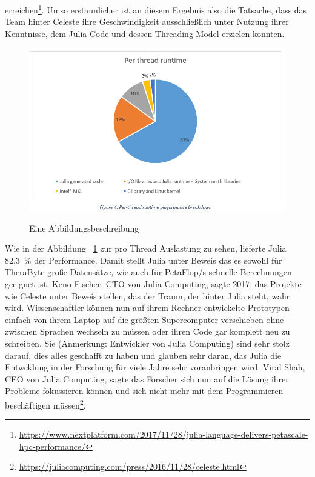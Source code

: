 \documentclass[proseminar,german,utf8]{zihpub}
\begin{document}
erreichen\footnote{\url{https://www.nextplatform.com/2017/11/28/julia-language-delivers-petascale-hpc-performance/}}. Umso erstaunlicher ist an diesem Ergebnis also die Tatsache, dass das Team hinter Celeste ihre Geschwindigkeit ausschließlich unter Nutzung ihrer Kenntnisse, dem Julia-Code und dessen Threading-Model erzielen konnten.

\begin{figure}[hbt!]
  \centering
  \caption{Eine Abbildungsbeschreibung}
  \includegraphics[scale=0.5]{bilder/celestejulia.png}
  \label{fig:celestejulia}
\end{figure}

Wie in der Abbildung ~\ref{fig:celestejulia} zur pro Thread Auslastung zu sehen, lieferte Julia 82.3~\% der Performance. Damit stellt Julia unter Beweis das es sowohl für TheraByte-große Datensätze, wie auch für PetaFlop/s-schnelle Berechnungen geeignet ist. Keno Fischer, CTO von Julia Computing, sagte 2017, das Projekte wie Celeste unter Beweis stellen, das der Traum, der hinter Julia steht, wahr wird. Wissenschaftler können nun auf ihrem Rechner entwickelte Prototypen einfach von ihrem Laptop auf die größten Supercomputer verschieben ohne zwischen Sprachen wechseln zu müssen oder ihren Code gar komplett neu zu schreiben. Sie (Anmerkung: Entwickler von Julia Computing) sind sehr stolz darauf, dies alles geschafft zu haben und glauben sehr daran, das Julia die Entwcklung in der Forschung für viele Jahre sehr voranbringen wird. Viral Shah, CEO von Julia Computing, sagte das Forscher sich nun auf die Lösung ihrer Probleme fokussieren können und sich nicht mehr mit dem Programmieren beschäftigen müssen\footnote{\url{https://juliacomputing.com/press/2016/11/28/celeste.html}}.
\end{document}
